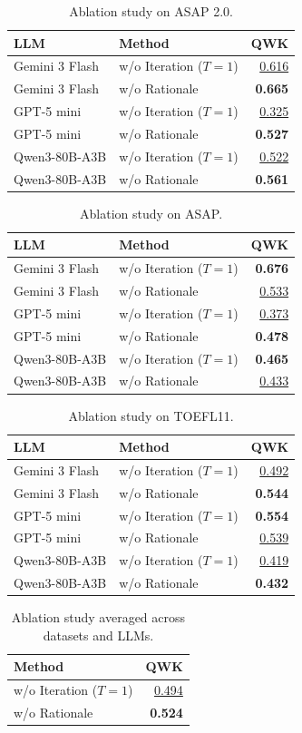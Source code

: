 \begin{table}[t]
\centering
\small
\caption{Ablation study on ASAP 2.0.}
\begin{tabular}{llr}
\toprule
LLM & Method & QWK \\
\midrule
Gemini 3 Flash & w/o Iteration ($T=1$) & \underline{0.616} \\
Gemini 3 Flash & w/o Rationale & \textbf{0.665} \\
\midrule
GPT-5 mini & w/o Iteration ($T=1$) & \underline{0.325} \\
GPT-5 mini & w/o Rationale & \textbf{0.527} \\
\midrule
Qwen3-80B-A3B & w/o Iteration ($T=1$) & \underline{0.522} \\
Qwen3-80B-A3B & w/o Rationale & \textbf{0.561} \\
\bottomrule
\end{tabular}
\end{table}

\begin{table}[t]
\centering
\small
\caption{Ablation study on ASAP.}
\begin{tabular}{llr}
\toprule
LLM & Method & QWK \\
\midrule
Gemini 3 Flash & w/o Iteration ($T=1$) & \textbf{0.676} \\
Gemini 3 Flash & w/o Rationale & \underline{0.533} \\
\midrule
GPT-5 mini & w/o Iteration ($T=1$) & \underline{0.373} \\
GPT-5 mini & w/o Rationale & \textbf{0.478} \\
\midrule
Qwen3-80B-A3B & w/o Iteration ($T=1$) & \textbf{0.465} \\
Qwen3-80B-A3B & w/o Rationale & \underline{0.433} \\
\bottomrule
\end{tabular}
\end{table}

\begin{table}[t]
\centering
\small
\caption{Ablation study on TOEFL11.}
\begin{tabular}{llr}
\toprule
LLM & Method & QWK \\
\midrule
Gemini 3 Flash & w/o Iteration ($T=1$) & \underline{0.492} \\
Gemini 3 Flash & w/o Rationale & \textbf{0.544} \\
\midrule
GPT-5 mini & w/o Iteration ($T=1$) & \textbf{0.554} \\
GPT-5 mini & w/o Rationale & \underline{0.539} \\
\midrule
Qwen3-80B-A3B & w/o Iteration ($T=1$) & \underline{0.419} \\
Qwen3-80B-A3B & w/o Rationale & \textbf{0.432} \\
\bottomrule
\end{tabular}
\end{table}

\begin{table}[t]
\centering
\small
\caption{Ablation study averaged across datasets and LLMs.}
\begin{tabular}{lr}
\toprule
Method & QWK \\
\midrule
w/o Iteration ($T=1$) & \underline{0.494} \\
w/o Rationale & \textbf{0.524} \\
\bottomrule
\end{tabular}
\end{table}
